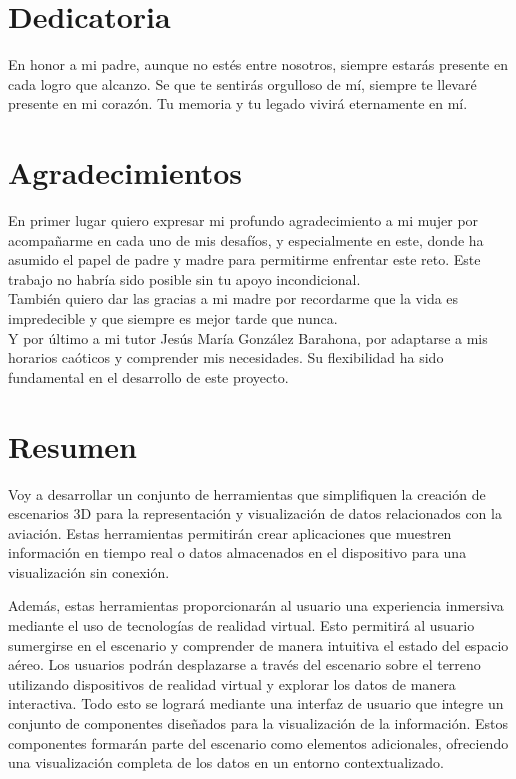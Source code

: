 \documentclass[a4paper, 11pt]{book}
\begin{document}

\chapter*{Dedicatoria}
En honor a mi padre, aunque no estés entre nosotros, siempre estarás presente en cada logro que alcanzo. Se que te sentirás orgulloso de mí, siempre te llevaré presente en mi corazón. Tu memoria y tu legado vivirá eternamente en mí.


\chapter*{Agradecimientos}

En primer lugar quiero expresar mi profundo agradecimiento a mi mujer por acompañarme en cada uno de mis desafíos, y especialmente en este, donde ha asumido el papel de padre y madre para permitirme enfrentar este reto. Este trabajo no habría sido posible sin tu apoyo incondicional.\\
También quiero dar las gracias a mi madre por recordarme que la vida es impredecible y que siempre es mejor tarde que nunca.\\
Y por último a mi tutor Jesús María González Barahona, por adaptarse a mis horarios caóticos y comprender mis necesidades. Su flexibilidad ha sido fundamental en el desarrollo de este proyecto.


\chapter*{Resumen}
Voy a desarrollar un conjunto de herramientas que simplifiquen la creación de escenarios \gls{3D} para la representación y visualización de datos relacionados con la aviación. Estas herramientas permitirán crear aplicaciones que muestren información en tiempo real o datos almacenados en el dispositivo para una visualización sin conexión.

Además, estas herramientas proporcionarán al usuario una experiencia inmersiva mediante el uso de tecnologías de realidad virtual. Esto permitirá al usuario sumergirse en el escenario y comprender de manera intuitiva el estado del espacio aéreo. Los usuarios podrán desplazarse a través del escenario sobre el terreno utilizando dispositivos de realidad virtual y explorar los datos de manera interactiva. Todo esto se logrará mediante una interfaz de usuario que integre un conjunto de componentes diseñados para la visualización de la información. Estos componentes formarán parte del escenario como elementos adicionales, ofreciendo una visualización completa de los datos en un entorno contextualizado.
\end{document}
